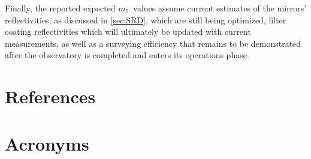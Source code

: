 \documentclass[PST,authoryear,toc]{lsstdoc}
\newcommand{\mf}{\ensuremath{m_5}}
\begin{document}
Finally, the reported expected \mf\ values assume current estimates of the mirrors' reflectivities, as discussed in \autoref{sec:SRD}, which are still being optimized, filter coating reflectivities which will ultimately be updated with current measurements, as well as a surveying efficiency that remains to be demonstrated after the observatory is completed and enters its operations phase. 


\appendix
\section{References} \label{sec:bib}
\renewcommand{\refname}{} %


\section{Acronyms} \label{sec:acronyms}

\end{document}
